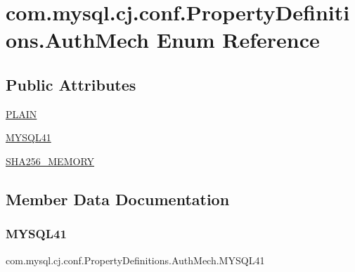 \hypertarget{enumcom_1_1mysql_1_1cj_1_1conf_1_1_property_definitions_1_1_auth_mech}{}\section{com.\+mysql.\+cj.\+conf.\+Property\+Definitions.\+Auth\+Mech Enum Reference}
\label{enumcom_1_1mysql_1_1cj_1_1conf_1_1_property_definitions_1_1_auth_mech}
\subsection*{Public Attributes}
\begin{DoxyCompactItemize}
\item 
\mbox{\hyperlink{enumcom_1_1mysql_1_1cj_1_1conf_1_1_property_definitions_1_1_auth_mech_a47ae7d254bd03352c6c4fb23f9fd3537}{P\+L\+A\+IN}}
\item 
\mbox{\hyperlink{enumcom_1_1mysql_1_1cj_1_1conf_1_1_property_definitions_1_1_auth_mech_ad4a7c09dc0556cd1ac196d04058d16f8}{M\+Y\+S\+Q\+L41}}
\item 
\mbox{\hyperlink{enumcom_1_1mysql_1_1cj_1_1conf_1_1_property_definitions_1_1_auth_mech_a2f3d0b1a3d5a5936c95a5e024f2f8a77}{S\+H\+A256\+\_\+\+M\+E\+M\+O\+RY}}
\end{DoxyCompactItemize}


\subsection{Member Data Documentation}
\mbox{\label{enumcom_1_1mysql_1_1cj_1_1conf_1_1_property_definitions_1_1_auth_mech_ad4a7c09dc0556cd1ac196d04058d16f8}} 
\subsubsection{\texorpdfstring{M\+Y\+S\+Q\+L41}{MYSQL41}}
{\footnotesize\ttfamily com.\+mysql.\+cj.\+conf.\+Property\+Definitions.\+Auth\+Mech.\+M\+Y\+S\+Q\+L41}

